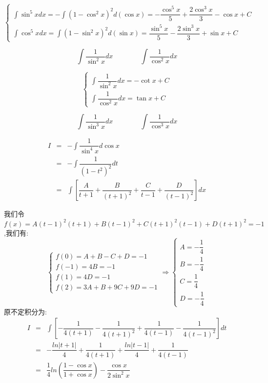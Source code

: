 \begin{corollary}[扩展不定积分]
\begin{solution}
		$$\begin{cases} \int \sin^{5} x dx = -\int (1-\cos^{2} x)^{2} d(\cos x) = -\dfrac{\cos^{5}x}{5} + \dfrac{2\cos^{3}x}{3} -\cos x+C \\ \int \cos^{5} x dx = \int (1-\sin^{2} x)^{2} d(\sin x) = \dfrac{\sin^{5}x}{5} - \dfrac{2\sin^{3}x}{3} + \sin x+C \end{cases}$$
	\end{solution}



	\begin{proposition}
		$$\int \dfrac{1}{\sin^{2}x} dx\qquad\qquad \int \dfrac{1}{\cos^{2} x}dx $$
	\end{proposition}
	\begin{solution}

		$$\begin{cases} \int \dfrac{1}{\sin^{2}x} dx = -\cot x+C\\  \int \dfrac{1}{\cos^{2}x} dx = \tan x+C \end{cases}$$
	\end{solution}



	\begin{proposition}
		$$\int \dfrac{1}{\sin^{3}x} dx\qquad\qquad \int \dfrac{1}{\cos^{3} x}dx $$
	\end{proposition}
	\begin{solution}
		\begin{eqnarray*}
			I&=&-\int \dfrac{1}{\sin^4 x}d\cos x\\
			&=&-\int \dfrac{1}{(1-t^2)^2}dt\\
			&=&\int\left[ \dfrac{A}{t+1}+\dfrac{B}{(t+1)^2}+\dfrac{C}{t-1}+\dfrac{D}{(t-1)^2}\right]dx 
		\end{eqnarray*}

		我们令$f(x)=A(t-1)^2(t+1)+B(t-1)^2+C(t+1)^2(t-1)+D(t+1)^2=-1$,我们有:  
		$$\left\lbrace
		\begin{array}{l}
			f(0)=A+B-C+D=-1\\
			f(-1)=4B=-1\\
			f(1)=4D=-1\\
			f(2)=3A+B+9C+9D=-1
		\end{array}
		\right. \Rightarrow \left\lbrace
		\begin{array}{l}
			A=-\dfrac{1}{4}\\
			B=-\dfrac{1}{4}\\
			C=\dfrac{1}{4}\\
			D=-\dfrac{1}{4}
		\end{array}
		\right. $$
		原不定积分为:  
		\begin{eqnarray*}
			I&=&\int\left[ -\dfrac{1}{4(t+1)}-\dfrac{1}{4(t+1)^2}+\dfrac{1}{4(t-1)}-\dfrac{1}{4(t-1)^2}\right]dt\\
			&=&-\dfrac{ln|t+1|}{4}+\dfrac{1}{4(t+1)}+\dfrac{ln|t-1|}{4}+\dfrac{1}{4(t-1)}\\
			&=&\dfrac{1}{4}ln\left(\dfrac{1-\cos x}{1+\cos x} \right)-\dfrac{\cos x}{2\sin^2 x}
		\end{eqnarray*}


\end{solution}
\end{corollary}
